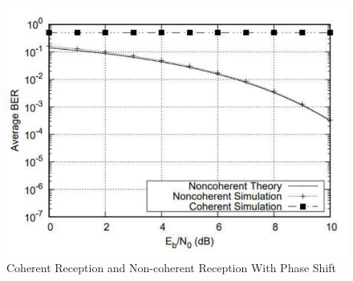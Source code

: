 \documentclass[technicalreport]{ieicej}
\begin{document}
\begin{figure}[tbp]
	\begin{center}
		\vspace{0cm}
		\includegraphics[width=\linewidth,clip]{fig/phase_shift.pdf}
		\caption{Coherent Reception and Non-coherent Reception With Phase Shift}
		\label{fig:sample}
	\end{center}
\end{figure}



\end{document}
